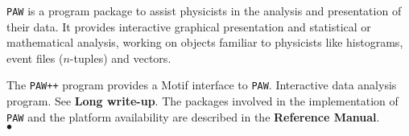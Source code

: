                      
              
             
{\tt PAW} is a program package to assist physicists in the analysis and
presentation of their data. It provides interactive graphical
presentation and statistical or mathematical analysis, working on
objects familiar to physicists like histograms, event files ($n$-tuples)
and vectors.
\par
The {\tt PAW++} program provides a Motif interface to {\tt PAW}.
\Structure
Interactive data analysis program.
\Usage
See {\bf Long write-up}.
\Notes
The packages involved in the implementation of {\tt PAW} and the
platform availability are described in the {\bf Reference Manual}.
\\ $\bullet$
